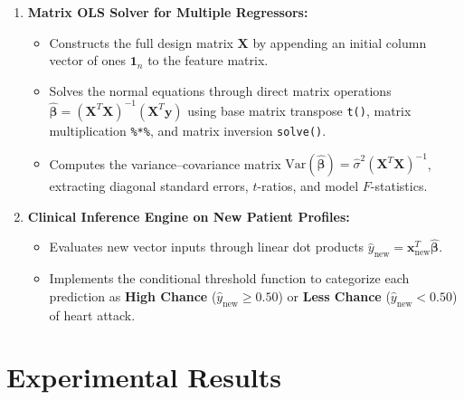 \documentclass[12pt,a4paper]{article}
\begin{document}
\begin{enumerate}
    \item \textbf{Matrix OLS Solver for Multiple Regressors:}
    \begin{itemize}
        \item Constructs the full design matrix $\mathbf{X}$ by appending an initial column vector of ones $\mathbf{1}_n$ to the feature matrix.
        \item Solves the normal equations through direct matrix operations $\hat{\boldsymbol{\beta}} = (\mathbf{X}^T \mathbf{X})^{-1} (\mathbf{X}^T \mathbf{y})$ using base matrix transpose \texttt{t()}, matrix multiplication \texttt{\%*\%}, and matrix inversion \texttt{solve()}.
        \item Computes the variance--covariance matrix $\text{Var}(\hat{\boldsymbol{\beta}}) = \hat{\sigma}^2 (\mathbf{X}^T \mathbf{X})^{-1}$, extracting diagonal standard errors, $t$-ratios, and model $F$-statistics.
    \end{itemize}

    \item \textbf{Clinical Inference Engine on New Patient Profiles:}
    \begin{itemize}
        \item Evaluates new vector inputs through linear dot products $\hat{y}_{\text{new}} = \mathbf{x}_{\text{new}}^T \hat{\boldsymbol{\beta}}$.
        \item Implements the conditional threshold function to categorize each prediction as \textbf{High Chance} ($\hat{y}_{\text{new}} \ge 0.50$) or \textbf{Less Chance} ($\hat{y}_{\text{new}} < 0.50$) of heart attack.
    \end{itemize}
\end{enumerate}

\section{Experimental Results}
\end{document}
